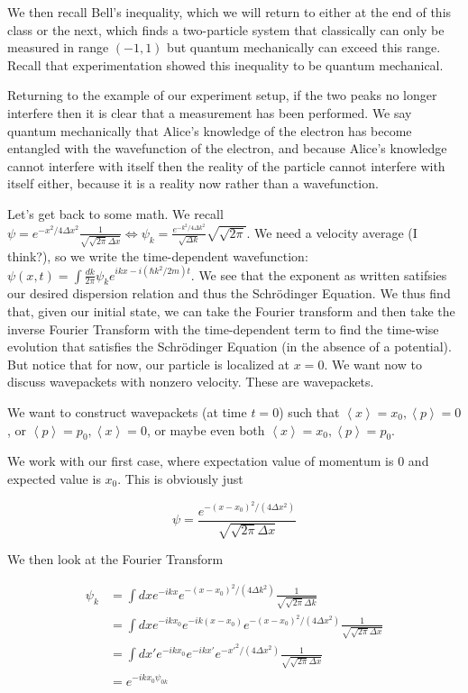 \documentclass{report}
\begin{document}
We then recall Bell's inequality, which we will return to either at the end of this class or the next, which finds a two-particle system that classically can only be measured in range $(-1,1)$ but quantum mechanically can exceed this range. Recall that experimentation showed this inequality to be quantum mechanical.

Returning to the example of our experiment setup, if the two peaks no longer interfere then it is clear that a measurement has been performed. We say quantum mechanically that Alice's knowledge of the electron has become entangled with the wavefunction of the electron, and because Alice's knowledge cannot interfere with itself then the reality of the particle cannot interfere with itself either, because it is a reality now rather than a wavefunction. 

Let's get back to some math. We recall $\psi = e^{-x^2/4\Delta x^2}\frac{1}{\sqrt{\sqrt{2\pi}\Delta x}} \Leftrightarrow \psi_k = \frac{e^{-k^2/4\Delta k^2}}{\sqrt{\Delta k}} \sqrt{\sqrt{2\pi}}$. We need a velocity average (I think?), so we write the time-dependent wavefunction: $\psi(x,t) = \int{\frac{dk}{2\pi}\psi_ke^{ikx - i(\hbar k^2/2m) t}}$. We see that the exponent as written satifsies our desired dispersion relation and thus the Schr\"odinger Equation. We thus find that, given our initial state, we can take the Fourier transform and then take the inverse Fourier Transform with the time-dependent term to find the time-wise evolution that satisfies the Schr\"odinger Equation (in the absence of a potential). But notice that for now, our particle is localized at $x=0$. We want now to discuss wavepackets with nonzero velocity. These are wavepackets.

We want to construct wavepackets (at time $t=0$) such that $\left<x\right> = x_0, \left<p\right> = 0$, or $\left<p\right> = p_0, \left<x\right> = 0$, or maybe even both $\left<x\right> = x_0, \left<p\right> = p_0$. 

We work with our first case, where expectation value of momentum is $0$ and expected value is $x_0$. This is obviously just

$$\psi = \frac{e^{-(x - x_0)^2/(4\Delta x^2)}}{\sqrt{\sqrt{2\pi}\Delta x}}$$

We then look at the Fourier Transform 

\begin{align*}
    \psi_k &= \int dx e^{-ikx}e^{-(x-x_0)^2/(4\Delta k^2)}\frac{1}{\sqrt{\sqrt{2\pi}\Delta k}}\\
&= \int dx e^{-ikx_0} e^{-ik(x-x_0)}e^{-(x-x_0)^2/(4\Delta x^2)} \frac{1}{\sqrt{\sqrt{2\pi}\Delta x}}\\
&= \int dx' e^{-ikx_0}e^{-ikx'}e^{-x'^2/(4\Delta x^2)}\frac{1}{\sqrt{\sqrt{2\pi}\Delta x}}\\
&= e^{-ikx_0 \psi_{0k}}
\end{align*}
\end{document}
